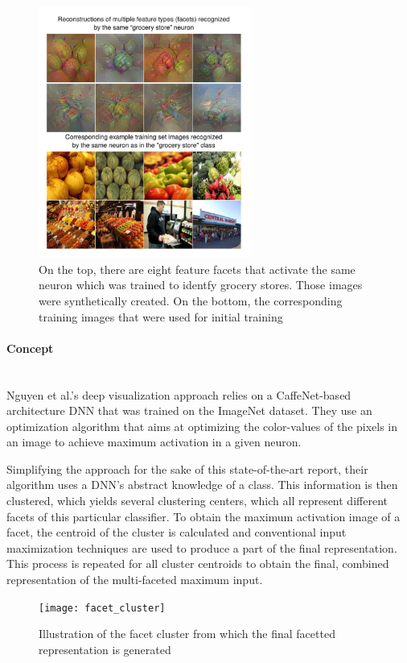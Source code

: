 \documentclass{acmsiggraph}               %
\newcommand{\paragraphbr}[1]{\paragraph{#1}\mbox{}\\}
\begin{document}
\begin{figure}[H]
\center
\includegraphics[width=2.75in]{multi-facet}
\caption{On the top, there are eight feature facets that activate the same neuron which was trained to identfy grocery stores. Those images were synthetically created. On the bottom, the corresponding training images that were used for initial training \protect\cite{Nguyen2016}}
\label{fig:multi}
\end{figure}

\pagebreak
\paragraphbr{Concept}

Nguyen et al.'s deep visualization approach relies on a CaffeNet-based architecture DNN that was trained on the ImageNet dataset. They use an optimization algorithm that aims at optimizing the color-values of the pixels in an image to achieve maximum activation in a given neuron.

Simplifying the approach for the sake of this state-of-the-art report, their algorithm uses a DNN's abstract knowledge of a class. This information is then clustered, which yields several clustering centers, which all represent different facets of this particular classifier. To obtain the maximum activation image of a facet, the centroid of the cluster is calculated and conventional input maximization techniques are used to produce a part of the final representation. This process is repeated for all cluster centroids to obtain the final, combined representation of the multi-faceted maximum input.

\begin{figure}
\center
\texttt{[image: facet\_cluster]}
\caption{Illustration of the facet cluster from which the final facetted representation is generated \protect\cite{Nguyen2016}}
\label{fig:facet_cluster}
\end{figure}
\end{document}
